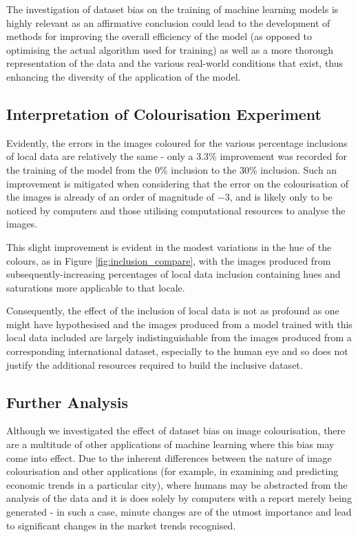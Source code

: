 \documentclass[conference]{IEEEtran}
\begin{document}
The investigation of dataset bias on the training of machine learning models is highly relevant as an affirmative conclusion could lead to the development of methods for improving the overall efficiency of the model (as opposed to optimising the actual algorithm used for training) as well as a more thorough representation of the data and the various real-world conditions that exist, thus enhancing the diversity of the application of the model.

\subsection{Interpretation of Colourisation Experiment}

Evidently, the errors in the images coloured for the various percentage inclusions of local data are relatively the same - only a 3.3\% improvement was recorded for the training of the model from the 0\% inclusion to the 30\% inclusion. Such an improvement is mitigated when considering that the error on the colourisation of the images is already of an order of magnitude of $-3$, and is likely only to be noticed by computers and those utilising computational resources to analyse the images.

This slight improvement is evident in the modest variations in the hue of the colours, as in Figure \ref{fig:inclusion_compare}, with the images produced from subsequently-increasing percentages of local data inclusion containing hues and saturations more applicable to that locale.

Consequently, the effect of the inclusion of local data is not as profound as one might have hypothesised and the images produced from a model trained with this local data included are largely indistinguishable from the images produced from a corresponding international dataset, especially to the human eye and so does not justify the additional resources required to build the inclusive dataset.

\subsection{Further Analysis}

Although we investigated the effect of dataset bias on image colourisation, there are a multitude of other applications of machine learning where this bias may come into effect. Due to the inherent differences between the nature of image colourisation and other applications (for example, in examining and predicting economic trends in a particular city), where humans may be abstracted from the analysis of the data and it is does solely by computers with a report merely being generated - in such a case, minute changes are of the utmost importance and lead to significant changes in the market trends recognised.
\end{document}
